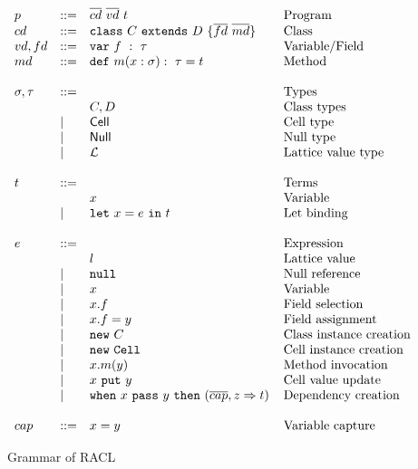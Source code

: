 \begin{figure}
  \centering
  $\begin{array}{lll@{\hspace{4mm}}l}
    p &::= &\overline{cd}~\overline{vd}~t  & \mbox{Program} \\
    cd &::= &\texttt{class}~C~\texttt{extends}~D~\{\overline{fd}~\overline{md}\}
    & \mbox{Class} \\
    vd,fd &::= &\texttt{var}~f~:~\tau & \mbox{Variable/Field} \\
    md &::= &\texttt{def}~m(x: \sigma):~\tau = t & \mbox{Method}\\
    &&&\\
    \sigma,\tau & ::= & & \mbox{Types} \\
    & & C, D & \mbox{Class types} \\ 
    &| & \CellType & \mbox{Cell type} \\
    &| & \NullType & \mbox{Null type} \\
    &| & \LatType & \mbox{Lattice value type} \\
    &&&\\
    t &::=& & \mbox{Terms} \\
    & & x & \mbox{Variable} \\
    &|& \texttt{let}~x = e~\texttt{in}~t &\mbox{Let binding} \\
    &&&\\
    e &::=& & \mbox{Expression} \\
    & & l & \mbox{Lattice value} \\
    &|& \texttt{null} & \mbox{Null reference} \\
    &|& x &\mbox{Variable} \\
    &|& x.f &\mbox{Field selection} \\
    &|& x.f = y & \mbox{Field assignment} \\
    &|& \texttt{new}~C & \mbox{Class instance creation} \\
    &|& \texttt{new}~\texttt{Cell} & \mbox{Cell instance creation} \\
    &|& x.m(y) & \mbox{Method invocation} \\
    &|& x~\texttt{put}~y & \mbox{Cell value update} \\
    &|& \texttt{when}~x~\texttt{pass}~y~\texttt{then}~(\overline{cap}, z
    \Rightarrow t) & \mbox{Dependency creation} \\
    &&&\\
    cap & ::= & x = y & \mbox{Variable capture} \\
  \end{array}$
  \caption{Grammar of RACL}
  \label{fig:racl_grammar}
\end{figure}

